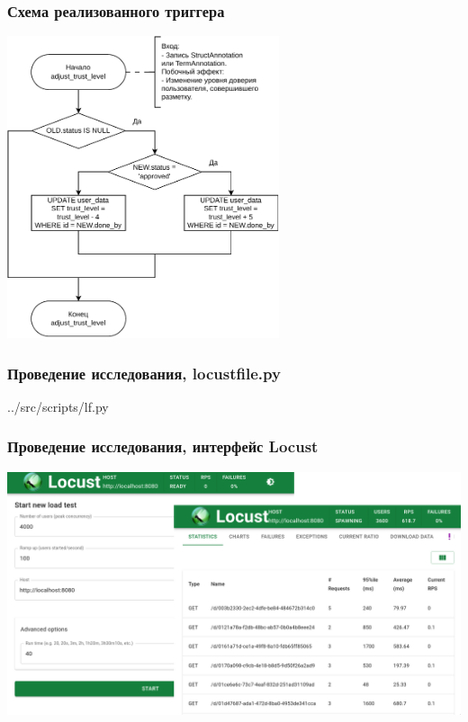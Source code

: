 \documentclass{beamer}
\begin{document}
\begin{frame}
    \frametitle{Схема реализованного триггера}
    \centering
	\includegraphics[width=0.6\textwidth]{diag/tech-trig-v4.pdf}
\end{frame}

\begin{frame}
    \frametitle{Проведение исследования, locustfile.py}
    \centering
{}
\begin{lstinputlisting}[
    label={lst:},
]{../src/scripts/lf.py}
\end{lstinputlisting}
\end{frame}

\begin{frame}
    \frametitle{Проведение исследования, интерфейс Locust}
    \centering
	\includegraphics[width=\textwidth]{img/pres-locust-1.png}
\end{frame}
\end{document}
